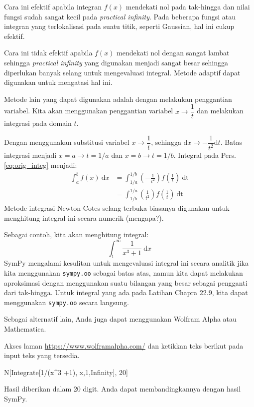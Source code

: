 \documentclass[a4paper,11pt,bahasa]{article} %
\newcommand{\pyinline}[1]{\texttt{#1}}
\begin{document}
Cara ini efektif apabila integran $f(x)$ mendekati nol pada tak-hingga dan nilai fungsi
sudah sangat kecil pada \textit{practical infinity}.
Pada beberapa fungsi atau integran yang terlokalisasi pada suatu titik, seperti Gaussian,
hal ini cukup efektif.

Cara ini tidak efektif apabila $f(x)$ mendekati nol dengan sangat lambat sehingga
\textit{practical infinity} yang digunakan menjadi sangat besar sehingga diperlukan
banyak selang untuk mengevaluasi integral. Metode adaptif dapat digunakan untuk
mengatasi hal ini.

Metode lain yang dapat digunakan adalah dengan melakukan penggantian variabel.
Kita akan menggunakan penggantian variabel $x \rightarrow \dfrac{1}{t}$ dan melakukan
integrasi pada domain $t$.

Dengan menggunakan substitusi variabel $x \rightarrow \dfrac{1}{t}$, sehingga
$\mathrm{d}x \rightarrow -\dfrac{1}{t^2} \mathrm{d}t$. Batas integrasi menjadi
$x=a \rightarrow t=1/a$ dan $x=b \rightarrow t=1/b$.
Integral pada Pers. \eqref{eq:orig_integ} menjadi:
\begin{align*}
\int_{a}^{b} f(x)\ \mathrm{d}x & = \int_{1/a}^{1/b}
\left( -\frac{1}{t^2} \right) f\left(\frac{1}{t}\right)\ \mathrm{dt} \\
& = \int_{1/b}^{1/a}
\left( \frac{1}{t^2} \right) f\left(\frac{1}{t}\right)\ \mathrm{dt}
\end{align*}
Metode integrasi Newton-Cotes selang terbuka biasanya digunakan
untuk menghitung integral ini secara numerik (mengapa?).

Sebagai contoh, kita akan menghitung integral:
\begin{equation}
\int_{1}^{\infty} \frac{1}{x^3 + 1}\ \mathrm{d}x
\end{equation}
SymPy mengalami kesulitan untuk mengevaluasi integral ini secara analitik
jika kita menggunakan \pyinline{sympy.oo} sebagai batas atas, namun kita
dapat melakukan aproksimasi dengan menggunakan suatu bilangan yang besar
sebagai pengganti dari tak-hingga. Untuk integral yang ada pada
Latihan Chapra 22.9, kita dapat menggunakan \pyinline{sympy.oo} secara
langsung.

Sebagai alternatif lain, Anda juga dapat menggunakan Wolfram Alpha
atau Mathematica.

Akses laman
{\scriptsize\url{https://www.wolframalpha.com/}} dan ketikkan teks
berikut pada input teks yang tersedia.
\begin{textcode}
N[Integrate[1/(x^3 +1), {x,1,Infinity}], 20]
\end{textcode}
Hasil diberikan dalam 20 digit. Anda dapat membandingkannya dengan hasil SymPy.
\end{document}
